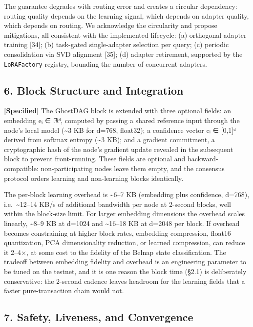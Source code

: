 The guarantee degrades with routing error and creates a circular
dependency: routing quality depends on the learning signal, which
depends on adapter quality, which depends on routing. We acknowledge the
circularity and propose mitigations, all consistent with the implemented
lifecycle: (a) orthogonal adapter training {[}34{]}; (b) task-gated
single-adapter selection per query; (c) periodic consolidation via SVD
alignment {[}35{]}; (d) adapter retirement, supported by the
\texttt{LoRAFactory} registry, bounding the number of concurrent
adapters.

\subsection{6. Block Structure and
Integration}\label{block-structure-and-integration}

\textbf{{[}Specified{]}} The GhostDAG block is extended with three
optional fields: an embedding eᵢ ∈ ℝᵈ, computed by passing a shared
reference input through the node's local model (\textasciitilde3 KB for
d=768, float32); a confidence vector cᵢ ∈ {[}0,1{]}ᵈ derived from
softmax entropy (\textasciitilde3 KB); and a gradient commitment, a
cryptographic hash of the node's gradient update revealed in the
subsequent block to prevent front-running. These fields are optional and
backward-compatible: non-participating nodes leave them empty, and the
consensus protocol orders learning and non-learning blocks identically.

The per-block learning overhead is \textasciitilde6--7 KB (embedding
plus confidence, d=768), i.e.~\textasciitilde12--14 KB/s of additional
bandwidth per node at 2-second blocks, well within the block-size limit.
For larger embedding dimensions the overhead scales linearly,
\textasciitilde8--9 KB at d=1024 and \textasciitilde16--18 KB at d=2048
per block. If overhead becomes constraining at higher block rates,
embedding compression, float16 quantization, PCA dimensionality
reduction, or learned compression, can reduce it 2--4×, at some cost to
the fidelity of the Belnap state classification. The tradeoff between
embedding fidelity and overhead is an engineering parameter to be tuned
on the testnet, and it is one reason the block time (§2.1) is
deliberately conservative: the 2-second cadence leaves headroom for the
learning fields that a faster pure-transaction chain would not.

\subsection{7. Safety, Liveness, and
Convergence}\label{safety-liveness-and-convergence}

